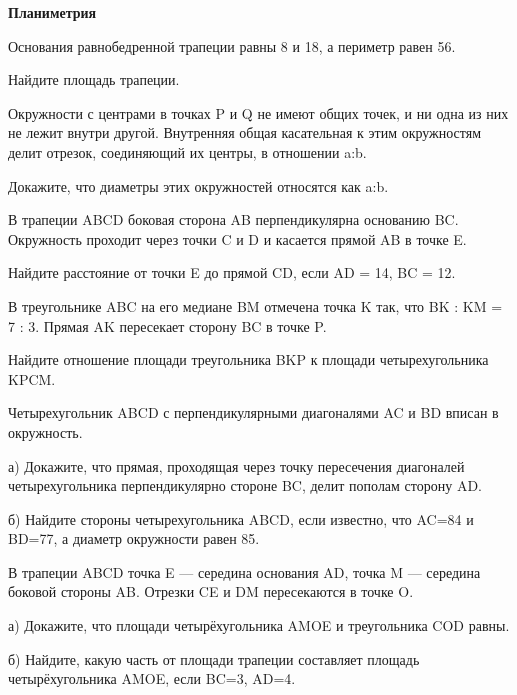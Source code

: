 \centerline{\bf \Huge Планиметрия}



 Основания равнобедренной трапеции равны 8 и 18, а периметр равен 56.

Найдите площадь трапеции.

 Окружности с центрами в точках P и Q не имеют общих точек, и ни одна из них не лежит внутри другой. Внутренняя общая касательная к этим окружностям делит отрезок, соединяющий их центры, в отношении a:b. 

Докажите, что диаметры этих окружностей относятся как a:b.

 В трапеции ABCD боковая сторона AB перпендикулярна основанию BC. Окружность проходит через точки C и D и касается прямой AB в точке E. 

Найдите расстояние от точки E до прямой CD, если AD = 14, BC = 12.


 В треугольнике ABC на его медиане BM отмечена точка K так, что BK : KM = 7 : 3. Прямая AK пересекает сторону BC в точке P.

Найдите отношение площади треугольника BKP к площади четырехугольника KPCM.

 Четырехугольник ABCD с перпендикулярными диагоналями AC и BD вписан в окружность.

а) Докажите, что прямая, проходящая через точку пересечения диагоналей четырехугольника перпендикулярно стороне BC, делит пополам сторону AD.

б) Найдите стороны четырехугольника ABCD, если известно, что AC=84 и BD=77, а диаметр окружности равен 85.

 В трапеции ABCD точка E — середина основания AD, точка M — середина боковой стороны AB. Отрезки CE и DM пересекаются в точке O.

а) Докажите, что площади четырёхугольника AMOE и треугольника COD равны.

б) Найдите, какую часть от площади трапеции составляет площадь четырёхугольника AMOE, если BC=3, AD=4.


